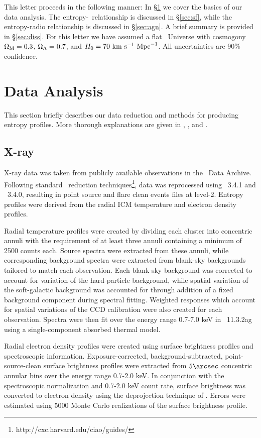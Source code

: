 \documentclass[12pt,preprint]{aastex}
\begin{document}
This letter proceeds in the following manner: In \S\ref{sec:data} we
cover the basics of our data analysis. The
entropy-\halpha\ relationship is discussed in \S\ref{sec:sf}, while
the entropy-radio relationship is discussed in \S\ref{sec:agn}. A
brief summary is provided in \S\ref{sec:diss}. For this letter we
have assumed a flat \LCDM\ Universe with cosmogony $\Omega_{\mathrm{M}}=0.3$,
$\Omega_{\mathrm{\Lambda}}=0.7$, and $H_0=70\mbox{\ensuremath{\mathrm{~km}}}\mathrm{\mbox{\ensuremath{\mathrm{~s}}}^{-1}}\mathrm{\mbox{\ensuremath{\mathrm{~Mpc}}}^{-1}}$. All uncertainties are 90\%
confidence.

\section{Data Analysis}
\label{sec:data}

This section briefly describes our data reduction and methods for
producing entropy profiles. More thorough explanations are given in
\cite{d06}, \cite{accept}, and \cite{xrayband}.

\subsection{X-ray}
\label{sec:xray}

X-ray data was taken from publicly available observations in the
\Chandra\ Data Archive. Following standard \Ciao\ reduction
techniques\footnote{http://cxc.harvard.edu/ciao/guides/}, data was
reprocessed using \Ciao\ 3.4.1 and \Caldb\ 3.4.0, resulting in point
source and flare clean events files at level-2. Entropy profiles were
derived from the radial ICM temperature and electron density profiles.

Radial temperature profiles were created by dividing each cluster into
concentric annuli with the requirement of at least three annuli
containing a minimum of 2500 counts each. Source spectra were
extracted from these annuli, while corresponding background spectra
were extracted from blank-sky backgrounds tailored to match each
observation. Each blank-sky background was corrected to account for
variation of the hard-particle background, while spatial variation of
the soft-galactic background was accounted for through addition of a
fixed background component during spectral fitting. Weighted responses
which account for spatial variations of the CCD calibration were also
created for each observation. Spectra were then fit over the energy
range 0.7-7.0 keV in \xspec\ 11.3.2ag \citep{xspec} using a
single-component absorbed thermal model.

Radial electron density profiles were created using surface brightness
profiles and spectroscopic information. Exposure-corrected,
background-subtracted, point-source-clean surface brightness profiles
were extracted from $5\arcsec$ concentric annular bins over the energy
range 0.7-2.0 keV. In conjunction with the spectroscopic normalization
and 0.7-2.0 keV count rate, surface brightness was converted to
electron density using the deprojection technique of
\cite{kriss83}. Errors were estimated using 5000 Monte Carlo
realizations of the surface brightness profile.
\end{document}
